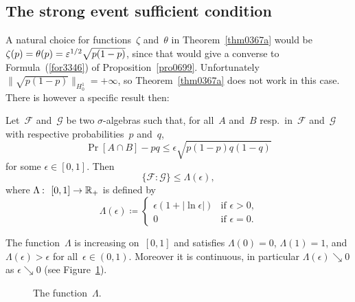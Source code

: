 \subsection{The strong event sufficient condition}\label{parTheStrongEventSufficientCondition}

A natural choice for functions~$\zeta$ and~$\theta$ in Theorem~\ref{thm0367a}
would be $\zeta(p) = \theta(p) = \epsilon^{1/2} \* \sqrt{p(1-p)}$,
since that would give a converse to Formula~(\ref{for3346}) of Proposition~\ref{pro0699}.
Unfortunately $\| \sqrt{p(1-p)} \|_{H^1_0} = +\infty$,
so Theorem~\ref{thm0367a} does not work in this case.
There is however a specific result then:

\begin{Thm}\label{thm0367b}
Let~$\mathcal{F}$ and~$\mathcal{G}$ be two $\sigma$-algebras
such that, for all~$A$ and~$B$ resp.\ in~$\mathcal{F}$ and~$\mathcal{G}$
with respective probabilities~$p$ and~$q$,
\[\label{for0256b} \Pr[A\cap B]-pq \leq \epsilon \sqrt{p(1-p)q(1-q)} \]
for some $\epsilon\in[0,1]$.
Then
\[\label{for7753} \{\mathcal{F}:\mathcal{G}\} \leq \Lambda(\epsilon) ,\]
where $\Lambda \colon [0,1] \to \RR_+$ is defined by
\[ \Lambda(\epsilon) \coloneqq \begin{cases} \epsilon (1+|\ln\epsilon|) & \text{if $\epsilon>0$,} \\
0 & \text{if $\epsilon=0$.} \end{cases}\]
\end{Thm}

\begin{Rmk}
The function~$\Lambda$ is increasing on~$[0,1]$ and satisfies
$\Lambda(0)=0$, $\Lambda(1)=1$, and $\Lambda(\epsilon)>\epsilon$
for all~$\epsilon\in(0,1)$.
Moreover it is continuous, in particular
$\Lambda(\epsilon) \searrow 0$ as $\epsilon \searrow 0$
(see Figure~\ref{fig-Lambda}).
\end{Rmk}
%
\begin{figure}
\centering
%
%
\caption{The function~$\Lambda$.}\label{fig-Lambda}
%
\end{figure}



